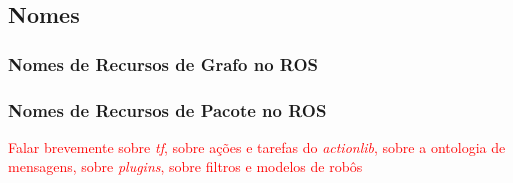         \subsection{Nomes}
            
            \subsubsection{Nomes de Recursos de Grafo no ROS}
        
            \subsubsection{Nomes de Recursos de Pacote no ROS}

    \textcolor{red}{Falar brevemente sobre \textit{tf}, sobre ações e tarefas do \textit{actionlib}, sobre a ontologia de mensagens, sobre \textit{plugins}, sobre filtros e modelos de robôs}